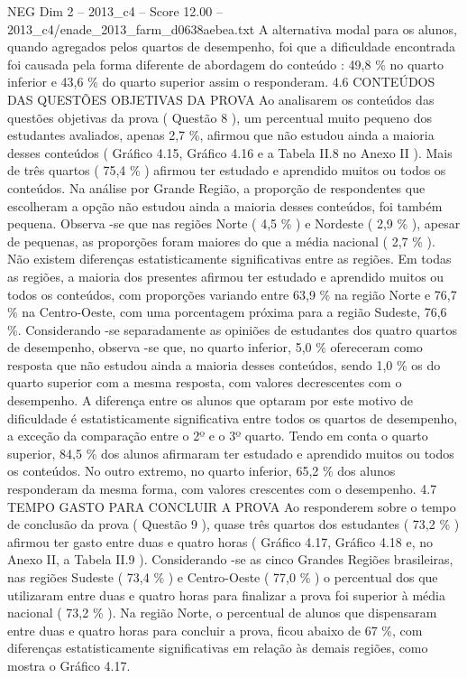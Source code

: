 \begin{textsample}{NEG Dim 2 – 2013\_c4 – Score 12.00 – 2013\_c4/enade\_2013\_farm\_d0638aebea.txt}
A alternativa modal para os alunos, quando agregados pelos quartos de desempenho, foi que a dificuldade encontrada foi causada pela forma diferente de abordagem do conteúdo : 49,8 \% no quarto inferior e 43,6 \% do quarto superior assim o responderam. 4.6 CONTEÚDOS DAS QUESTÕES OBJETIVAS DA PROVA Ao analisarem os conteúdos das questões objetivas da prova ( Questão 8 ), um percentual muito pequeno dos estudantes avaliados, apenas 2,7 \%, afirmou que não estudou ainda a maioria desses conteúdos ( Gráfico 4.15, Gráfico 4.16 e a Tabela II.8 no Anexo II ).
Mais de três quartos ( 75,4 \% ) afirmou ter estudado e aprendido muitos ou todos os conteúdos.
Na análise por Grande Região, a proporção de respondentes que escolheram a opção não estudou ainda a maioria desses conteúdos, foi também pequena.
Observa -se que nas regiões Norte ( 4,5 \% ) e Nordeste ( 2,9 \% ), apesar de pequenas, as proporções foram maiores do que a média nacional ( 2,7 \% ).
Não existem diferenças estatisticamente significativas entre as regiões.
Em todas as regiões, a maioria dos presentes afirmou ter estudado e aprendido muitos ou todos os conteúdos, com proporções variando entre 63,9 \% na região Norte e 76,7 \% na Centro-Oeste, com uma porcentagem próxima para a região Sudeste, 76,6 \%.
Considerando -se separadamente as opiniões de estudantes dos quatro quartos de desempenho, observa -se que, no quarto inferior, 5,0 \% ofereceram como resposta que não estudou ainda a maioria desses conteúdos, sendo 1,0 \% os do quarto superior com a mesma resposta, com valores decrescentes com o desempenho.
A diferença entre os alunos que optaram por este motivo de dificuldade é estatisticamente significativa entre todos os quartos de desempenho, a exceção da comparação entre o 2º e o 3º quarto.
Tendo em conta o quarto superior, 84,5 \% dos alunos afirmaram ter estudado e aprendido muitos ou todos os conteúdos.
No outro extremo, no quarto inferior, 65,2 \% dos alunos responderam da mesma forma, com valores crescentes com o desempenho. 4.7 TEMPO GASTO PARA CONCLUIR A PROVA Ao responderem sobre o tempo de conclusão da prova ( Questão 9 ), quase três quartos dos estudantes ( 73,2 \% ) afirmou ter gasto entre duas e quatro horas ( Gráfico 4.17, Gráfico 4.18 e, no Anexo II, a Tabela II.9 ).
Considerando -se as cinco Grandes Regiões brasileiras, nas regiões Sudeste ( 73,4 \% ) e Centro-Oeste ( 77,0 \% ) o percentual dos que utilizaram entre duas e quatro horas para finalizar a prova foi superior à média nacional ( 73,2 \% ).
Na região Norte, o percentual de alunos que dispensaram entre duas e quatro horas para concluir a prova, ficou abaixo de 67 \%, com diferenças estatisticamente significativas em relação às demais regiões, como mostra o Gráfico 4.17.

\end{textsample}
